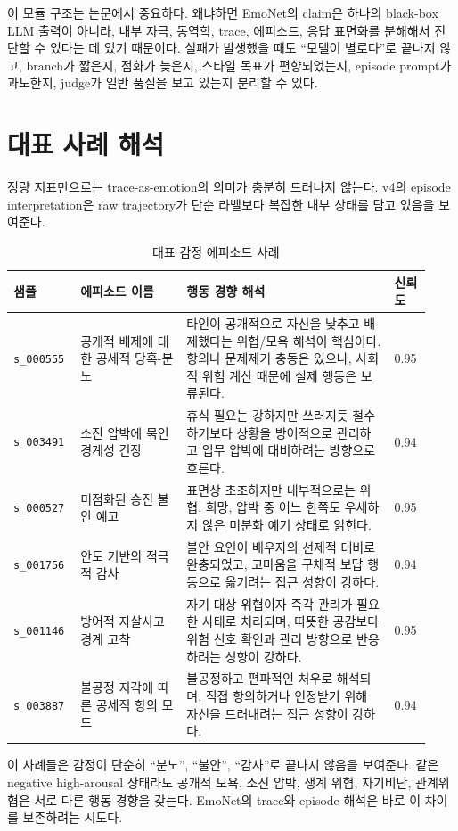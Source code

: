 \documentclass[11pt,a4paper]{article}
\newcommand{\eng}[1]{\texttt{#1}}
\begin{document}
이 모듈 구조는 논문에서 중요하다. 왜냐하면 EmoNet의 claim은 하나의 black-box LLM 출력이 아니라, 내부 자극, 동역학, trace, 에피소드, 응답 표면화를 분해해서 진단할 수 있다는 데 있기 때문이다. 실패가 발생했을 때도 ``모델이 별로다''로 끝나지 않고, branch가 짧은지, 점화가 늦은지, 스타일 목표가 편향되었는지, episode prompt가 과도한지, judge가 일반 품질을 보고 있는지 분리할 수 있다.

\section{대표 사례 해석}

정량 지표만으로는 trace-as-emotion의 의미가 충분히 드러나지 않는다. v4의 episode interpretation은 raw trajectory가 단순 라벨보다 복잡한 내부 상태를 담고 있음을 보여준다.

\begin{longtable}{p{0.14\linewidth}p{0.24\linewidth}p{0.47\linewidth}p{0.08\linewidth}}
\caption{대표 감정 에피소드 사례}\\
\toprule
샘플 & 에피소드 이름 & 행동 경향 해석 & 신뢰도 \\
\midrule
\eng{s\_000555} & 공개적 배제에 대한 공세적 당혹-분노 & 타인이 공개적으로 자신을 낮추고 배제했다는 위협/모욕 해석이 핵심이다. 항의나 문제제기 충동은 있으나, 사회적 위험 계산 때문에 실제 행동은 보류된다. & 0.95 \\
\eng{s\_003491} & 소진 압박에 묶인 경계성 긴장 & 휴식 필요는 강하지만 쓰러지듯 철수하기보다 상황을 방어적으로 관리하고 업무 압박에 대비하려는 방향으로 흐른다. & 0.94 \\
\eng{s\_000527} & 미점화된 승진 불안 예고 & 표면상 초조하지만 내부적으로는 위협, 희망, 압박 중 어느 한쪽도 우세하지 않은 미분화 예기 상태로 읽힌다. & 0.95 \\
\eng{s\_001756} & 안도 기반의 적극적 감사 & 불안 요인이 배우자의 선제적 대비로 완충되었고, 고마움을 구체적 보답 행동으로 옮기려는 접근 성향이 강하다. & 0.94 \\
\eng{s\_001146} & 방어적 자살사고 경계 고착 & 자기 대상 위협이자 즉각 관리가 필요한 사태로 처리되며, 따뜻한 공감보다 위험 신호 확인과 관리 방향으로 반응하려는 성향이 강하다. & 0.95 \\
\eng{s\_003887} & 불공정 지각에 따른 공세적 항의 모드 & 불공정하고 편파적인 처우로 해석되며, 직접 항의하거나 인정받기 위해 자신을 드러내려는 접근 성향이 강하다. & 0.94 \\
\bottomrule
\end{longtable}

이 사례들은 감정이 단순히 ``분노'', ``불안'', ``감사''로 끝나지 않음을 보여준다. 같은 negative high-arousal 상태라도 공개적 모욕, 소진 압박, 생계 위협, 자기비난, 관계위협은 서로 다른 행동 경향을 갖는다. EmoNet의 trace와 episode 해석은 바로 이 차이를 보존하려는 시도다.
\end{document}
